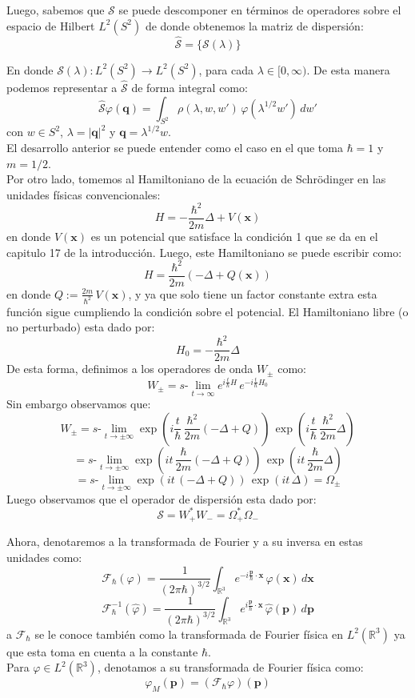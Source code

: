 \documentclass[12pt]{book}
\numberwithin{equation}{chapter}
\def\q{\mathbf{q}}
\def\R{\mathbb{R}}
\def\S{\mathcal{S}}
\def\rar{\rightarrow}
\def\F{\mathcal{F}}
\def\x{\mathbf{x}}
\def\P{\mathbf{p}}
\def\O{\Omega}
\def\slim{s\mbox{-}\lim}
\begin{document}
Luego, sabemos que $\S$ se puede descomponer en t\'erminos de operadores sobre el espacio de Hilbert $L^{2}(S^{2})$ de donde obtenemos la matriz de dispersi\'on:
$$ \hat{\S}=\{ \S(\lambda) \} $$

En donde $\S(\lambda): L^{2}(S^{2}) \rar L^{2}(S^{2})$, para cada $\lambda \in [0,\infty)$. De esta manera podemos representar a $\hat{\S}$ de forma integral como:
\begin{equation}\label{Shat-phi}
\hat{\S}\varphi(\q)= \int_{S^{2}} \rho(\lambda,w,w' )\, \varphi(\lambda^{1/2} w') \, dw'
\end{equation}
con $w \in S^{2}$, $ \lambda =|\q|^{2} $ y $ \q= \lambda^{1/2}w $.\\

El desarrollo anterior se puede entender como el caso en el que toma $\hbar=1$ y $m=1/2$.\\

Por otro lado, tomemos al Hamiltoniano de la ecuaci\'on de Schr\"odinger en las unidades f\'isicas convencionales:
$$ H= -\frac{\hbar^{2}}{2m} \Delta + V(\x) $$
en donde $V(\x)$ es un potencial que satisface la condici\'on 1 que se da en el capitulo 17 de la introducci\'on. Luego, este Hamiltoniano se puede escribir como:
$$ H= \frac{\hbar^{2}}{2m}(-\Delta +Q(\x)) $$
en donde $Q:= \frac{2m}{\hbar^{2}}\, V(\x)$, y ya que solo tiene un factor constante extra esta funci\'on sigue cumpliendo la condici\'on sobre el potencial. El Hamiltoniano libre (o no perturbado) esta dado por:
$$ H_{0}= -\frac{\hbar^{2}}{2m} \Delta $$
De esta forma, definimos a los operadores de onda $W_{\pm}$ como:
$$ W_{\pm}= \slim_{t \rar \infty} e^{i \frac{t}{\hbar}H} \, e^{-i \frac{t}{\hbar}H_{0} } $$
Sin embargo observamos que:
$$ W_{\pm}= \slim_{t \rar \pm\infty} \exp \left( i\frac{t}{\hbar}\,\frac{\hbar^{2}}{2m}(-\Delta +Q) \right) \, \exp \left( i \frac{t}{\hbar}\,\frac{\hbar^{2}}{2m} \Delta \right)   $$
$$ =\slim_{t \rar \pm\infty} \exp \left( it\,\frac{\hbar}{2m}(-\Delta +Q) \right) \, \exp \left( it\,\frac{\hbar}{2m} \Delta \right) $$
$$ =\slim_{t \rar \pm\infty} \exp \left( it\,(-\Delta +Q) \right) \, \exp \left( it\,\Delta \right) = \O_{\pm} $$
Luego observamos que el operador de dispersi\'on esta dado por:
\begin{equation}\label{S-equiv}
\S= W_{+}^{*}W_{-} = \O_{+}^{*}\O_{-}
\end{equation}

Ahora, denotaremos a la transformada de Fourier y a su inversa en estas unidades como:
$$ \F_{\hbar}(\varphi)  = \frac{1}{(2 \pi \hbar)^{3/2}} \int_{\R^{3}} e^{-i\frac{\P}{\hbar}\cdot \x} \, \varphi(\x)\, d\x $$
$$ \F_{\hbar}^{-1}(\hat{\varphi})  = \frac{1}{(2 \pi \hbar)^{3/2}} \int_{\R^{3}} e^{i\frac{\P}{\hbar}\cdot \x} \, \hat{\varphi}(\P)\, d\P $$
a $\F_{\hbar}$ se le conoce tambi\'en como la transformada de Fourier f\'isica en $L^{2}(\R^{3})$ ya que esta toma en cuenta a la constante $\hbar$.\\
Para $\varphi \in L^{2}(\R^{3})$, denotamos a su transformada de Fourier f\'isica como:
$$ \varphi_{M}(\P)= ( \F_{\hbar} \varphi )(\P) $$
\end{document}
